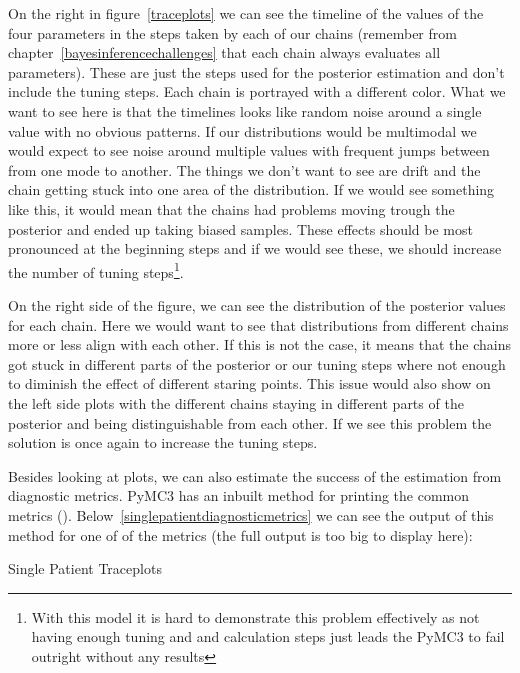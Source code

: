 \documentclass[12pt,a4paper,leqno]{report}
\theoremstyle{plain}
\theoremstyle{definition}
\theoremstyle{remark}
\begin{document}
On the right in figure\ \ref{traceplots} we can see the timeline of the values of the
four parameters in the steps taken by each of our
chains (remember from chapter\ \ref{bayesinferencechallenges} that
each chain always evaluates all parameters). These are just the steps used for the
posterior estimation and don't include the
tuning steps. Each chain is portrayed with a different color. What we want to see
here is that the timelines looks like random noise around a single value with no obvious
patterns. If our distributions would be multimodal we would expect to see noise around
multiple values with frequent jumps between from one mode to another. The things
we don't want to see are drift and the chain getting stuck into one area of the
distribution. If we would see something like this,
it would mean that the chains had problems moving trough the posterior and ended up
taking biased samples. These effects should be most pronounced at the beginning
steps and if we would see these, we should increase the number of tuning
steps\footnote{With this model it is hard to
demonstrate this problem effectively as not having enough tuning and and
calculation steps just leads the PyMC3 to fail outright without any results}.

On the right side of the figure, we can see the distribution of the posterior values for
each chain. Here we
would want to see that distributions from different chains more or less align with
each other. If this is not the case, it means that the chains got stuck in different
parts of the posterior or our tuning steps where not enough to diminish the effect of
different staring points. This issue would also show on the left side plots with the different
chains staying in different parts of the posterior and being distinguishable from each
other. If we see this problem the solution is once again to increase the tuning steps.

Besides looking at plots, we can also estimate the success of the estimation from
diagnostic metrics. PyMC3 has an inbuilt method for printing the common metrics
(). Below\ \ref{singlepatientdiagnosticmetrics} we can see the output
of this method for one of of the metrics (the full output is too big to display here):

\bigskip
\begin{table}[H]
    \caption{Single Patient Traceplots}\label{singlepatientdiagnosticmetrics}
    \bigskip
    \centering
    
\end{table}
\smallskip
\end{document}
